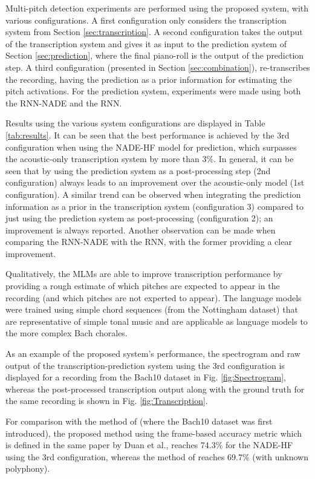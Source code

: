 Multi-pitch detection experiments are performed using the proposed system, with various configurations. A first configuration only considers the transcription system from Section \ref{sec:transcription}. A second configuration takes the output of the transcription system and gives it as input to the prediction system of Section \ref{sec:prediction}, where the final piano-roll is the output of the prediction step. A third configuration (presented in Section \ref{sec:combination}), re-transcribes the recording, having the prediction as a prior information for estimating the pitch activations. For the prediction system, experiments were made using both the RNN-NADE and the RNN.

Results using the various system configurations are displayed in Table \ref{tab:results}. It can be seen that the best performance is achieved by the 3rd configuration when using the NADE-HF model for prediction, which surpasses the acoustic-only transcription system by more than 3\%. In general, it can be seen that by using the prediction system as a post-processing step (2nd configuration) always leads to an improvement over the acoustic-only model (1st configuration). A similar trend can be observed when integrating the prediction information as a prior in the transcription system (configuration 3) compared to just using the prediction system as post-processing (configuration 2); an improvement is always reported. Another observation can be made when comparing the RNN-NADE with the RNN, with the former providing a clear improvement. 

Qualitatively, the MLMs are able to improve transcription performance by providing a rough estimate of which pitches are expected to appear in the recording (and which pitches are not experted to appear). The language models were trained using simple chord sequences (from the Nottingham dataset) that are representative of simple tonal music and are applicable as language models to the more complex Bach chorales.

As an example of the proposed system's performance, the spectrogram and raw output of the transcription-prediction system using the 3rd configuration is displayed for a recording from the Bach10 dataset in Fig. \ref{fig:Spectrogram}, whereas the post-processed transcription output along with the ground truth for the same recording is shown in Fig. \ref{fig:Transcription}.

For comparison with the method of \cite{Duan2010} (where the Bach10 dataset was first introduced), the proposed method using the frame-based accuracy metric which is defined in the same paper by Duan et al., reaches 74.3\% for the NADE-HF using the 3rd configuration, whereas the method of \cite{Duan2010} reaches 69.7\% (with unknown polyphony).


